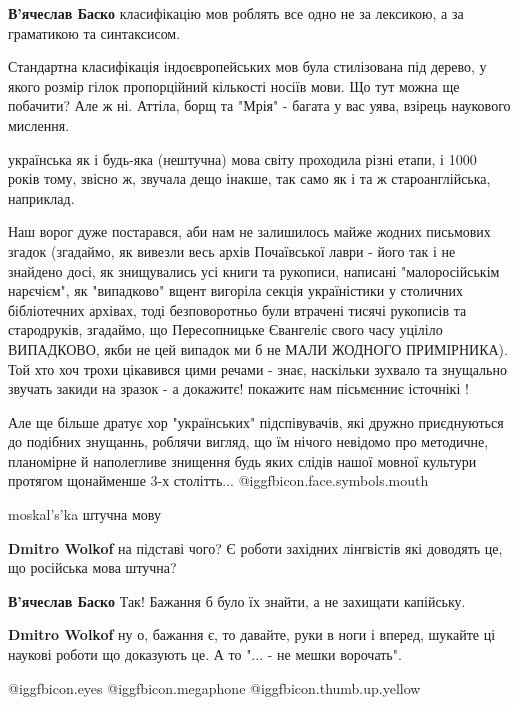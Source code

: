\begin{itemize}
\begin{itemize}
\begin{itemize}
\textbf{В'ячеслав Баско} класифікацію мов роблять все одно не за лексикою, а за граматикою та синтаксисом.

\end{itemize} %

\end{itemize} %


Стандартна класифікація індоєвропейських мов була стилізована під дерево, у
якого розмір гілок пропорційний кількості носіїв мови. Що тут можна ще
побачити? Але ж ні. Аттіла, борщ та "Мрія" - багата у вас уява, взірець
наукового мислення.


українська як і будь-яка (нештучна) мова світу проходила різні етапи, і 1000
років тому, звісно ж, звучала дещо інакше, так само як і та ж староанглійська,
наприклад.

Наш ворог дуже постарався, аби нам не залишилось майже жодних письмових згадок
(згадаймо, як вивезли весь архів Почаївської лаври - його так і не знайдено
досі, як знищувались усі книги та рукописи, написані "малоросійськім нарєчієм",
як "випадково" вщент вигоріла секція україністики у столичних бібліотечних
архівах, тоді безповоротньо були втрачені тисячі рукописів та стародруків,
згадаймо, що Пересопницьке Євангеліє свого часу уціліло ВИПАДКОВО, якби не цей
випадок ми б не МАЛИ ЖОДНОГО ПРИМІРНИКА). Той хто хоч трохи цікавився цими
речами - знає, наскільки зухвало та знущально звучать закиди на зразок - а
докажитє! покажитє нам пісьмєнниє істочнікі !

Але ще більше дратує хор "українських" підспівувачів, які дружно приєднуються
до подібних знущаннь, роблячи вигляд, що їм нічого невідомо про методичне,
планомірне й наполегливе знищення будь яких слідів нашої мовної культури
протягом щонайменше 3-х столітть...   @igg{fbicon.face.symbols.mouth} 

moskal's'ka штучна мову

\begin{itemize} %
\textbf{Dmitro Wolkof} на підставі чого? Є роботи західних лінгвістів які доводять це, що російська мова штучна?

\begin{itemize} %
\textbf{В'ячеслав Баско} Так! Бажання б було їх знайти, а не захищати капійську.

\textbf{Dmitro Wolkof} ну о, бажання є, то давайте, руки в ноги і вперед, шукайте ці наукові роботи що доказують це. А то "... - не мешки ворочать".
\end{itemize} %

\end{itemize} %

 @igg{fbicon.eyes}  @igg{fbicon.megaphone}  @igg{fbicon.thumb.up.yellow} 

\end{itemize} %
